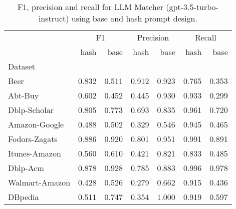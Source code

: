 \begin{table}
\centering
\caption{F1, precision and recall for LLM Matcher (gpt-3.5-turbo-instruct) using base and hash prompt design.}
\label{tab:base-vs-hash-abs}
\begin{tabular}{lrrrrrr}
\toprule
 & \multicolumn{2}{c}{F1} & \multicolumn{2}{c}{Precision} & \multicolumn{2}{c}{Recall} \\
 & hash & base & hash & base & hash & base \\
Dataset &  &  &  &  &  &  \\
\midrule
Beer & 0.832 & 0.511 & 0.912 & 0.923 & 0.765 & 0.353 \\
Abt-Buy & 0.602 & 0.452 & 0.445 & 0.930 & 0.933 & 0.299 \\
Dblp-Scholar & 0.805 & 0.773 & 0.693 & 0.835 & 0.961 & 0.720 \\
Amazon-Google & 0.488 & 0.502 & 0.329 & 0.546 & 0.945 & 0.465 \\
Fodors-Zagats & 0.886 & 0.920 & 0.801 & 0.951 & 0.991 & 0.891 \\
Itunes-Amazon & 0.560 & 0.610 & 0.421 & 0.821 & 0.833 & 0.485 \\
Dblp-Acm & 0.878 & 0.928 & 0.785 & 0.883 & 0.996 & 0.978 \\
Walmart-Amazon & 0.428 & 0.526 & 0.279 & 0.662 & 0.915 & 0.436 \\
DBpedia & 0.511 & 0.747 & 0.354 & 1.000 & 0.919 & 0.597 \\
\bottomrule
\end{tabular}
\end{table}
